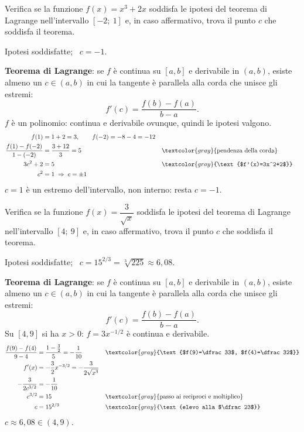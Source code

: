 \begin{question}[ID=1.1, subtitle={Teorema di Lagrange per $f(x)=x^3+2x$ su $[-2,1]$}, tags={lagrange, teoremi}, difficulty=facile]
Verifica se la funzione \(f(x) = x^3+2x\) soddisfa le ipotesi del teorema di Lagrange nell'intervallo \([-2;\ 1]\) e, in caso affermativo, trova il punto \(c\) che soddisfa il teorema.
\begin{solution}
Ipotesi soddisfatte; \ $c=-1$.
\end{solution}
\begin{explanation}
\textbf{Teorema di Lagrange}: se $f$ è continua su $[a,b]$ e derivabile in $(a,b)$, esiste almeno un $c\in(a,b)$ in cui la tangente è parallela alla corda che unisce gli estremi:
\[ f'(c)=\dfrac{f(b)-f(a)}{b-a}. \]
$f$ è un polinomio: continua e derivabile ovunque, quindi le ipotesi valgono.
\[\begin{aligned}
f(1) &= 1+2=3, \qquad f(-2)=-8-4=-12\\
\dfrac{f(1)-f(-2)}{1-(-2)} &= \dfrac{3+12}{3}=5 && \textcolor{gray}{\text{pendenza della corda}}\\
3c^2+2 &= 5 && \textcolor{gray}{\text{$f'(x)=3x^2+2$}}\\
c^2 &= 1 \;\Rightarrow\; c=\pm1
\end{aligned}\]
$c=1$ è un estremo dell'intervallo, non interno: resta $c=-1$.
\end{explanation}
\end{question}


\begin{question}[ID=1.2, subtitle={Teorema di Lagrange per $f(x)=3/\sqrt{x}$ su $[4,9]$}, tags={lagrange, teoremi}, difficulty=media]
Verifica se la funzione \(f(x) = \dfrac{3}{\sqrt{x}}\) soddisfa le ipotesi del teorema di Lagrange nell'intervallo \([4;\ 9]\) e, in caso affermativo, trova il punto \(c\) che soddisfa il teorema.
\begin{solution}
Ipotesi soddisfatte; \ $c=15^{2/3}=\sqrt[3]{225}\approx6{,}08$.
\end{solution}
\begin{explanation}
\textbf{Teorema di Lagrange}: se $f$ è continua su $[a,b]$ e derivabile in $(a,b)$, esiste almeno un $c\in(a,b)$ in cui la tangente è parallela alla corda che unisce gli estremi:
\[ f'(c)=\dfrac{f(b)-f(a)}{b-a}. \]
Su $[4,9]$ si ha $x>0$: $f=3x^{-1/2}$ è continua e derivabile.
\[\begin{aligned}
\dfrac{f(9)-f(4)}{9-4} &= \dfrac{1-\frac32}{5}=-\dfrac{1}{10} && \textcolor{gray}{\text{$f(9)=\dfrac33$, $f(4)=\dfrac32$}}\\
f'(x) &= -\dfrac32x^{-3/2}=-\dfrac{3}{2\sqrt{x^3}}\\
-\dfrac{3}{2c^{3/2}} &= -\dfrac1{10}\\
c^{3/2} &= 15 && \textcolor{gray}{\text{passo ai reciproci e moltiplico}}\\
c &= 15^{2/3} && \textcolor{gray}{\text{elevo alla $\dfrac23$}}
\end{aligned}\]
$c\approx6{,}08\in(4,9)$.
\end{explanation}
\end{question}


